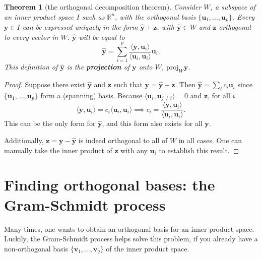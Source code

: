 \documentclass[draft,12pt]{report}
\newtheorem{theorem}{Theorem}
\renewcommand{\vec}[1]{\mathbf{#1}}
\begin{document}
\begin{theorem}[the orthogonal decomposition theorem]
    Consider $W$, a subspace of an inner product space $I$ such as $\mathbb R^n$, with the orthogonal basis $\{ \vec{u}_1, \ldots, \vec{u}_p \}$. Every $\vec{y} \in I$ can be expressed uniquely in the form $\vec{\hat{y}} + \vec{z}$, with $\vec{\hat{y}} \in W$ and $\vec{z}$ orthogonal to every vector in $W$. $\vec{\hat{y}}$ will be equal to
    \[ \vec{\hat{y}} = \sum_{i = 1}^p \frac{\langle \vec{y}, \vec{u}_i \rangle}{\langle \vec{u}_i, \vec{u}_i \rangle} \vec{u}_i. \]
    This definition of $\vec{\hat{y}}$ is the \textbf{projection} of $\vec{y}$ onto $W$, $\mathrm{proj}_W \vec{y}$.
\end{theorem}
\begin{proof}
    Suppose there exist $\vec{\hat{y}}$ and $\vec{z}$ such that $\vec{y} = \vec{\hat{y}} + \vec{z}$. Then $\vec{\hat{y}} = \sum_i c_i \vec{u}_i$ since $\{ \vec{u}_1, \ldots, \vec{u}_p \}$ form a (spanning) basis. Because $\langle \vec{u}_i, \vec{u}_{j \neq i} \rangle = 0$ and $\vec{z}$, for all $i$
    \[ \langle \vec{y}, \vec{u}_i \rangle = c_i \langle \vec{u}_i, \vec{u}_i \rangle \implies c_i = \frac{\langle \vec{y}, \vec{u}_i \rangle}{\langle \vec{u}_i, \vec{u}_i \rangle}. \]
    This can be the only form for $\vec{\hat{y}}$, and this form also exists for all $\vec{y}$.
    
    Additionally, $\vec{z} = \vec{y} - \vec{\hat{y}}$ is indeed orthogonal to all of $W$ in all cases. One can manually take the inner product of $\vec{z}$ with any $\vec{u}_i$ to establish this result.
\end{proof}

\section{Finding orthogonal bases: the Gram-Schmidt process}

Many times, one wants to obtain an orthogonal basis for an inner product space. Luckily, the Gram-Schmidt process helps solve this problem, if you already have a non-orthogonal basis $\{ \vec{v}_1, \ldots, \vec{v}_q \}$ of the inner product space.
\end{document}

